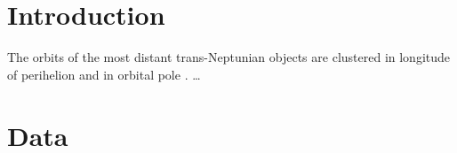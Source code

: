 \documentclass[twocolumn,linenumbers]{aastex631}
\begin{document}

\section{Introduction}\label{sec:intro}
The orbits of the most distant trans-Neptunian objects are clustered in longitude of perihelion and in orbital pole \citep{Trujillo2014,Batygin2016}. \dots

\section{Data}\label{sec:data}
\end{document}
